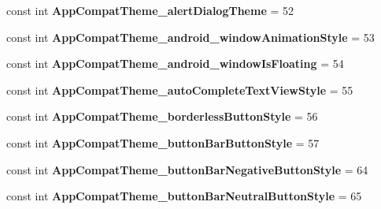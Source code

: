 \begin{DoxyCompactItemize}
\mbox{\label{classst_delivery_1_1_resource_1_1_styleable_a040362a8a81200ca542ef171870f015e}} 
const int {\bfseries App\+Compat\+Theme\+\_\+alert\+Dialog\+Theme} = 52
\item 
\mbox{\label{classst_delivery_1_1_resource_1_1_styleable_a48eda87e628b7de8aea30efa347784b3}} 
const int {\bfseries App\+Compat\+Theme\+\_\+android\+\_\+window\+Animation\+Style} = 53
\item 
\mbox{\label{classst_delivery_1_1_resource_1_1_styleable_aff7d88bfc01d7c1032ddffb208382ae4}} 
const int {\bfseries App\+Compat\+Theme\+\_\+android\+\_\+window\+Is\+Floating} = 54
\item 
\mbox{\label{classst_delivery_1_1_resource_1_1_styleable_ae15c50f3bea44a5a588f4513bfe028f0}} 
const int {\bfseries App\+Compat\+Theme\+\_\+auto\+Complete\+Text\+View\+Style} = 55
\item 
\mbox{\label{classst_delivery_1_1_resource_1_1_styleable_a9f6952eaf91afeef0ac6ec37e2d9a3c8}} 
const int {\bfseries App\+Compat\+Theme\+\_\+borderless\+Button\+Style} = 56
\item 
\mbox{\label{classst_delivery_1_1_resource_1_1_styleable_a0f6a75c1bd1e394f550116d820d605c5}} 
const int {\bfseries App\+Compat\+Theme\+\_\+button\+Bar\+Button\+Style} = 57
\item 
\mbox{\label{classst_delivery_1_1_resource_1_1_styleable_abc30094efaf7d5a35fddb6489e7fdb9a}} 
const int {\bfseries App\+Compat\+Theme\+\_\+button\+Bar\+Negative\+Button\+Style} = 64
\item 
\mbox{\label{classst_delivery_1_1_resource_1_1_styleable_a28f6c69deb41c80177c8be4c170c21b5}} 
const int {\bfseries App\+Compat\+Theme\+\_\+button\+Bar\+Neutral\+Button\+Style} = 65
\item 
\mbox{\label{classst_delivery_1_1_resource_1_1_styleable_a4669cd5d7115d2e097f78ec92dca1583}} 

\end{DoxyCompactItemize}
